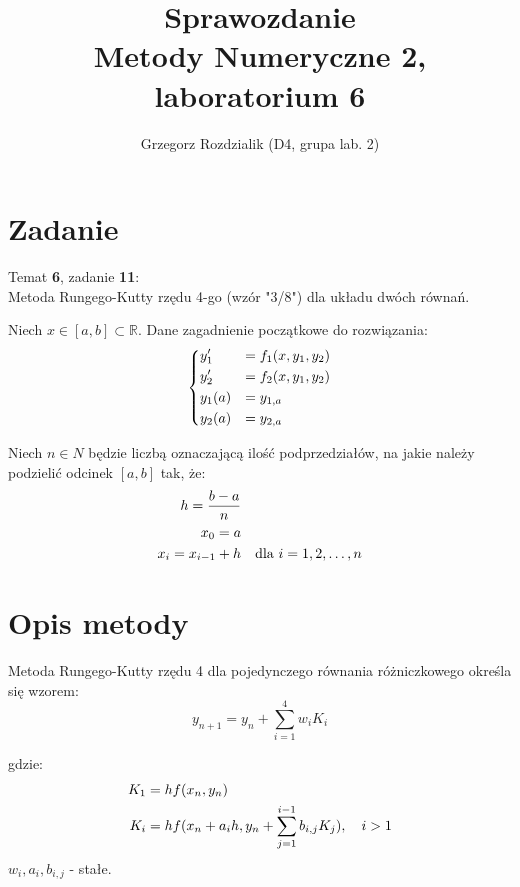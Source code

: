 \documentclass[12pt]{article}
\begin{document}
	\title{Sprawozdanie\\Metody Numeryczne 2, laboratorium 6}
	\author{Grzegorz Rozdzialik (D4, grupa lab. 2)}
	\maketitle	
	
	\section{Zadanie}
	{\Large Temat \textbf{6}, zadanie \textbf{11}:}\\
	Metoda Rungego-Kutty rzędu 4-go (wzór "3/8") dla układu dwóch równań.
	
	Niech $x \in [a, b] \subset \mathbb{R}$. Dane zagadnienie początkowe do rozwiązania:
	\begin{equation}
	\begin{dcases}
		y_1' &= f_1(x, y_1, y_2) \\
		y_2' &= f_2(x, y_1, y_2) \\
		y_1(a) &= y_{1, a} \\
		y_2(a) &= y_{2, a}
	\end{dcases}
	\end{equation}
	
	Niech $n \in N$ będzie liczbą oznaczającą ilość podprzedziałów, na jakie należy podzielić odcinek $[a, b]$ tak, że:
	\begin{align*}
		h = \frac{b - a}{n} & \\
		x_0 = a & \\
		x_i = x_{i - 1} + h & \hspace{10px} \mbox{dla } i = 1, 2, \dots, n
	\end{align*}
	
	
	
	
	\section{Opis metody}
	Metoda Rungego-Kutty rzędu 4 dla pojedynczego równania różniczkowego określa się wzorem:
	\begin{equation}
		\label{eq:RK4}
		y_{n+1} = y_n + \sum_{i = 1}^{4} w_i K_i
	\end{equation}
	
	gdzie:
	\begin{align*}
		K_1 &= hf(x_n, y_n) \\
		K_i &= hf(x_n + a_i h, y_n + \sum_{j = 1}^{i - 1} b_{i, j} K_j), \hspace{10px} i > 1
	\end{align*}
	$w_i, a_i, b_{i, j}$ - stałe.
	
\end{document}
